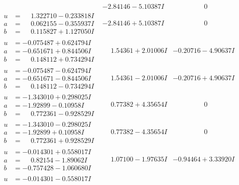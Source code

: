 \documentclass[1p]{elsarticle_modified}
\theoremstyle{definition}
\begin{document}
$$\begin{array}{c|c|c}
 & -2.84146 - 5.10387 I & \phantom{-0.000000 } 0 \\ \hline\begin{aligned}
u &= \phantom{-}1.322710 - 0.233818 I \\
a &= \phantom{-}0.062155 - 0.355937 I \\
b &= \phantom{-}0.115827 + 1.127050 I\end{aligned}
 & -2.84146 + 5.10387 I & \phantom{-0.000000 } 0 \\ \hline\begin{aligned}
u &= -0.075487 + 0.624794 I \\
a &= -0.651671 + 0.844506 I \\
b &= \phantom{-}0.148112 + 0.734294 I\end{aligned}
 & \phantom{-}1.54361 + 2.01006 I & -0.20716 - 4.90637 I \\ \hline\begin{aligned}
u &= -0.075487 - 0.624794 I \\
a &= -0.651671 - 0.844506 I \\
b &= \phantom{-}0.148112 - 0.734294 I\end{aligned}
 & \phantom{-}1.54361 - 2.01006 I & -0.20716 + 4.90637 I \\ \hline\begin{aligned}
u &= -1.343010 + 0.298025 I \\
a &= -1.92899 - 0.10958 I \\
b &= \phantom{-}0.772361 - 0.928529 I\end{aligned}
 & \phantom{-}0.77382 + 4.35654 I & \phantom{-0.000000 } 0 \\ \hline\begin{aligned}
u &= -1.343010 - 0.298025 I \\
a &= -1.92899 + 0.10958 I \\
b &= \phantom{-}0.772361 + 0.928529 I\end{aligned}
 & \phantom{-}0.77382 - 4.35654 I & \phantom{-0.000000 } 0 \\ \hline\begin{aligned}
u &= -0.014301 + 0.558017 I \\
a &= \phantom{-}0.82154 - 1.89062 I \\
b &= -0.757428 - 1.060680 I\end{aligned}
 & \phantom{-}1.07100 - 1.97635 I & -0.94464 + 3.33920 I \\ \hline\begin{aligned}
u &= -0.014301 - 0.558017 I \\

\end{aligned}
\end{array}$$
\end{document}
